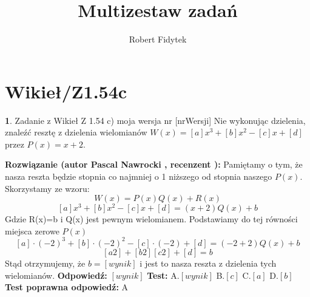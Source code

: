 \documentclass[12pt, a4paper]{article}
\title{Multizestaw zadań}
\author{Robert Fidytek}
\date{}
\theoremstyle{definition} %
\newtheorem{zad}{}
\newcommand{\kategoria}[1]{\section{#1}} %
\newcommand{\zadStart}[1]{\begin{zad}#1\newline} %
\newcommand{\zadStop}{\end{zad}}   %
\newcommand{\rozwStart}[2]{\noindent \textbf{Rozwiązanie (autor #1 , recenzent #2): }\newline} %
\newcommand{\odpStart}{\noindent \textbf{Odpowiedź:}\newline}    %
\newcommand{\odpStop}{\newline}                                             %
\newcommand{\testStart}{\noindent \textbf{Test:}\newline} %
\newcommand{\testStop}{\newline} %
\newcommand{\kluczStart}{\noindent \textbf{Test poprawna odpowiedź:}\newline} %
\newcommand{\kluczStop}{\newline} %
\begin{document}
\maketitle
\kategoria{Wikieł/Z1.54c}
\zadStart{Zadanie z Wikieł Z 1.54 c) moja wersja nr [nrWersji]}
Nie wykonując dzielenia, znaleźć resztę z dzielenia wielomianów $W(x)=[a]x^3+[b]x^2-[c]x+[d]$ przez $P(x)=x+2$.
\zadStop
\rozwStart{Pascal Nawrocki}{}
Pamiętamy o tym, że nasza reszta będzie stopnia co najmniej o 1 niższego od stopnia naszego $P(x)$. Skorzystamy ze wzoru:
$$W(x)=P(x)Q(x)+R(x)$$
$$[a]x^3+[b]x^2-[c]x+[d]=(x+2)Q(x)+b$$
Gdzie R(x)=b i Q(x) jest pewnym wielomianem. Podstawiamy do tej równości miejsca zerowe $P(x)$
$$[a]\cdot(-2)^3+[b]\cdot(-2)^2-[c]\cdot(-2)+[d]=(-2+2)Q(x)+b$$
$$[a2]+[b2][c2]+[d]=b$$
Stąd otrzymujemy, że $b=[wynik]$ i jest to nasza reszta z dzielenia tych wielomianów.
\odpStart
$[wynik]$
\odpStop
\testStart
A.$[wynik]$
B.$[c]$
C.$[a]$
D.$[b]$
\testStop
\kluczStart
A
\kluczStop
\end{document}
